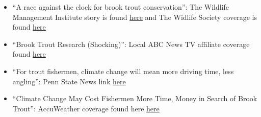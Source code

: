 \documentclass[10pt]{article}
\begin{document}
\begin{flushleft}
\begin{itemize}
\item ``A race against the clock for brook trout conservation'': The Wildlife Management Institute story is found \href{https://wildlifemanagement.institute/outdoor-news-bulletin/september-2016/race-against-clock-brook-trout-conservation}{here} and The Widlife Society coverage is found
\href{http://wildlife.org/a-race-against-the-clock-for-brook-trout-conservation/}{here}\\
\item ``Brook Trout Research (Shocking)'': Local ABC News TV affiliate coverage found \href{http://wnep.com/2016/09/25/brook-trout-research-shocking/}{here}\\
\item ``For trout fishermen, climate change will mean more driving time, less angling'': Penn State News link
\href{http://news.psu.edu/story/366131/2015/08/20/research/trout-fishermen-climate-change-will-mean-more-driving-time-less}{here}
\item ``Climate Change May Cost Fishermen More Time, Money in Search of Brook Trout'': AccuWeather coverage found here \href{http://www.accuweather.com/en/weather-news/climate-change-brook-trout-fisherman-high-cost/52151933}{here}\\


\end{itemize}
\end{flushleft}
\end{document}
